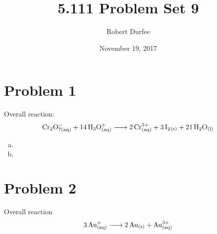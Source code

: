 \documentclass{article}
\title{ 5.111 Problem Set 9 }
\author{ Robert Durfee }
\date{ November 19, 2017 }
\begin{document}
\maketitle

\section*{ Problem 1 }

Overall reaction:
$$\ce{Cr_2O^-_{7(aq)} + 14H_3O^+_{(aq)} -> 2Cr^{3+}_{(aq)} + 3I_2_{(s)} +
21H_2O_{(l)}}$$

\begin{enumerate}[a.]
    \item 

    \item
\end{enumerate}

\section*{ Problem 2 }
Overall reaction
$$\ce{3Au^+_{(aq)} -> 2Au_{(s)} + Au^{3+}_{(aq)}}$$
\end{document}
